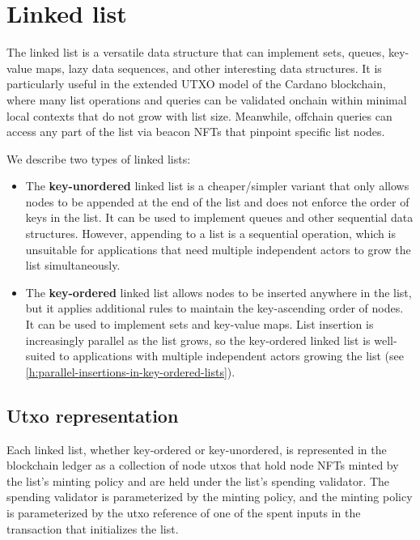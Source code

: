 \documentclass[../midgard.tex]{subfiles}
\begin{document}
\section{Linked list}
\label{h:linked-list}

The linked list is a versatile data structure that can implement sets, queues, key-value maps, lazy data sequences, and other interesting data structures.
It is particularly useful in the extended UTXO model of the Cardano blockchain, where many list operations and queries can be validated onchain within minimal local contexts that do not grow with list size.
Meanwhile, offchain queries can access any part of the list via beacon NFTs that pinpoint specific list nodes.

We describe two types of linked lists:

\begin{itemize}
    \item The \textbf{key-unordered} linked list is a cheaper/simpler variant that only allows nodes to be appended at the end of the list and does not enforce the order of keys in the list.
      It can be used to implement queues and other sequential data structures.
      However, appending to a list is a sequential operation, which is unsuitable for applications that need multiple independent actors to grow the list simultaneously.
    \item The \textbf{key-ordered} linked list allows nodes to be inserted anywhere in the list, but it applies additional rules to maintain the key-ascending order of nodes.
      It can be used to implement sets and key-value maps.
      List insertion is increasingly parallel as the list grows, so the key-ordered linked list is well-suited to applications with multiple independent actors growing the list (see \cref{h:parallel-insertions-in-key-ordered-lists}).
\end{itemize}

\subsection{Utxo representation}
\label{h:list-utxo-representation}

Each linked list, whether key-ordered or key-unordered, is represented in the blockchain ledger as a collection of node utxos that hold node NFTs minted by the list's minting policy and are held under the list's spending validator.
The spending validator is parameterized by the minting policy, and the minting policy is parameterized by the utxo reference of one of the spent inputs in the transaction that initializes the list.
\end{document}
